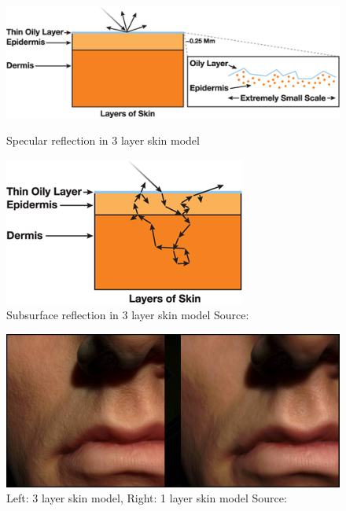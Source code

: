 \documentclass[ngerman,runningheads,a4paper]{llncs}[2018/03/10]
\begin{document}
\begin{figure}[!h]
  \centering
  \begin{minipage}{.5\textwidth}
    \centering
    \includegraphics[scale=0.5,keepaspectratio]{./images/multilayer-skin-specular-reflection.jpg}
    \caption{Specular reflection in 3 layer skin model}
    \label{fig:test1}
  \end{minipage}%
  \begin{minipage}{.5\textwidth}
    \centering
    \includegraphics[scale=0.5,keepaspectratio]{./images/multilayer-skin-subsurface.jpg}
    \caption{Subsurface reflection in 3 layer skin model Source: \citet{advanced-realtime-skin-rendering}}
    \label{fig:test2}
  \end{minipage}
\end{figure}

\begin{figure}[!h]
  \centering
  \includegraphics[scale=0.25,keepaspectratio]{./images/importance-of-layer-amount}
    \caption{Left: 3 layer skin model, Right: 1 layer skin model Source: \citet{efficient-human-skin-rendering}}
\end{figure}
\end{document}

